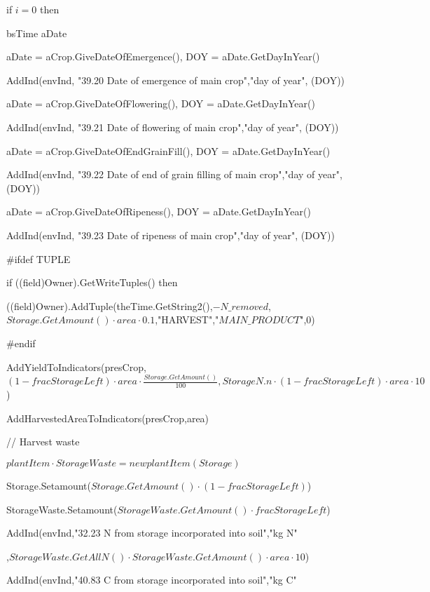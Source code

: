 \documentclass[%
]{scrartcl}
\begin{document}
{{{if $i=0$ then
			      			      		
bsTime aDate
			   			
aDate = aCrop.GiveDateOfEmergence(),			      		
 DOY = aDate.GetDayInYear()
			      		
 AddInd(envInd,	 "39.20 Date of emergence of main crop","day of year", (DOY))
			   			
aDate = aCrop.GiveDateOfFlowering(),			      		
DOY = aDate.GetDayInYear()
							
 AddInd(envInd,	 "39.21 Date of flowering of main crop","day of year", (DOY))
			   			
aDate = aCrop.GiveDateOfEndGrainFill(),			      		
DOY = aDate.GetDayInYear()
							
 AddInd(envInd,	 "39.22 Date of end of grain filling of main crop","day of year", (DOY))
						
	aDate = aCrop.GiveDateOfRipeness(),			      		
DOY = aDate.GetDayInYear()
			         	 
AddInd(envInd,	 "39.23 Date of ripeness of main crop","day of year", (DOY))
			      	

\#ifdef TUPLE
        
 if ((field)Owner).GetWriteTuples() then
          
  ((field)Owner).AddTuple(theTime.GetString2(),$-N\_removed$,$Storage.GetAmount() \cdot area \cdot 0.1$,"HARVEST","$MAIN\_PRODUCT$",0)

\#endif
       
  AddYieldToIndicators(presCrop,$(1-fracStorageLeft) \cdot area \cdot \tfrac{Storage.GetAmount()}{100},StorageN.n \cdot (1-fracStorageLeft) \cdot area \cdot 10$)
        
 AddHarvestedAreaToIndicators(presCrop,area)

         // Harvest waste
         
$plantItem  \cdot  StorageWaste = new plantItem(Storage)$
       
  Storage.Setamount($Storage.GetAmount() \cdot (1-fracStorageLeft)$)
      
   StorageWaste.Setamount($StorageWaste.GetAmount() \cdot fracStorageLeft$)
       
  AddInd(envInd,"32.23 N from storage incorporated into soil","kg N"

,$StorageWaste.GetAllN() \cdot StorageWaste.GetAmount() \cdot area \cdot 10$)
       
  AddInd(envInd,"40.83 C from storage incorporated into soil","kg C"

}}}
\end{document}
